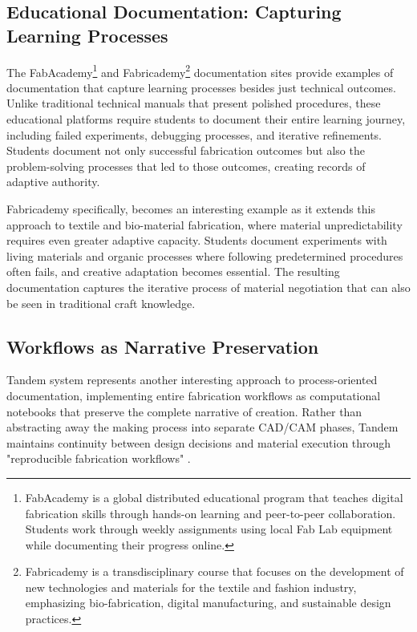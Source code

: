 \subsection{Educational Documentation: Capturing Learning Processes}

The FabAcademy\footnote{FabAcademy is a global distributed educational program that teaches digital fabrication skills through hands-on learning and peer-to-peer collaboration. Students work through weekly assignments using local Fab Lab equipment while documenting their progress online.} and Fabricademy\footnote{Fabricademy is a transdisciplinary course that focuses on the development of new technologies and materials for the textile and fashion industry, emphasizing bio-fabrication, digital manufacturing, and sustainable design practices.} documentation sites provide examples of documentation that capture learning processes besides just technical outcomes. Unlike traditional technical manuals that present polished procedures, these educational platforms require students to document their entire learning journey, including failed experiments, debugging processes, and iterative refinements. Students document not only successful fabrication outcomes but also the problem-solving processes that led to those outcomes, creating records of adaptive authority.

\vspace{0.5cm}

Fabricademy specifically, becomes an interesting example as it extends this approach to textile and bio-material fabrication, where material unpredictability requires even greater adaptive capacity. Students document experiments with living materials and organic processes where following predetermined procedures often fails, and creative adaptation becomes essential. The resulting documentation captures the iterative process of material negotiation that can also be seen in traditional craft knowledge.

\subsection{Workflows as Narrative Preservation}

Tandem system \citep{tran_oleary_tandem_2024} represents another interesting approach to process-oriented documentation, implementing entire fabrication workflows as computational notebooks that preserve the complete narrative of creation. Rather than abstracting away the making process into separate CAD/CAM phases, Tandem maintains continuity between design decisions and material execution through "reproducible fabrication workflows" \citep{tran_oleary_tandem_2024}.

